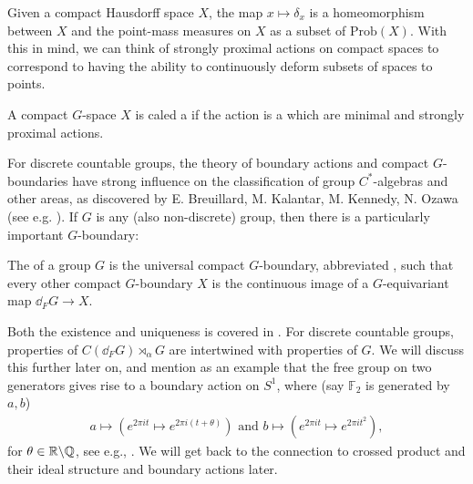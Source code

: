 \begin{note}
	Given a compact Hausdorff space $X$, the map $x \mapsto \delta_x$ is a homeomorphism between $X$ and the point-mass measures on $X$ as a subset of $\mathrm{Prob}(X)$. With this in mind, we can think of strongly proximal actions on compact spaces to correspond to having the ability to continuously deform subsets of spaces to points.
\end{note}
\begin{definition}
	A compact $G$-space $X$ is caled a  if the action is a  which are minimal and strongly proximal actions.
\end{definition}
For discrete countable groups, the theory of boundary actions and compact $G$-boundaries have strong influence on the classification of group $C^*$-algebras and other areas, as discovered by E. Breuillard, M. Kalantar, M. Kennedy, N. Ozawa (see e.g. \cite{breuillard2017c}). If $G$ is any (also non-discrete) group, then there is a particularly important $G$-boundary:
\begin{definition}
	The  of a group $G$ is the universal compact $G$-boundary, abbreviated , such that every other compact $G$-boundary $X$ is the continuous image of a $G$-equivariant map $\dd_F G \to X$.
\end{definition}
Both the existence and uniqueness is covered in \cite[Chapter 4]{bscp}. For discrete countable groups, properties of $C(\dd_F G) \rtimes_\alpha G$ are intertwined with properties of $G$. We will discuss this further later on, and mention as an example that the free group on two generators gives rise to a boundary action on $S^1$, where (say $\mathbb{F}_2$ is generated by $a,b$)
\begin{align*}
	a \mapsto (e^{2 \pi i t} \mapsto e^{2 \pi i (t+\theta)}) \text{  and  } b \mapsto (e^{2 \pi i t} \mapsto e^{2 \pi i t^{2}}),
\end{align*}
for $\theta \in \mathbb{R}\backslash \mathbb{Q}$, see e.g., \cite[Example 4.13]{bscp}. We will get back to the connection to crossed product and their ideal structure and boundary actions later.

